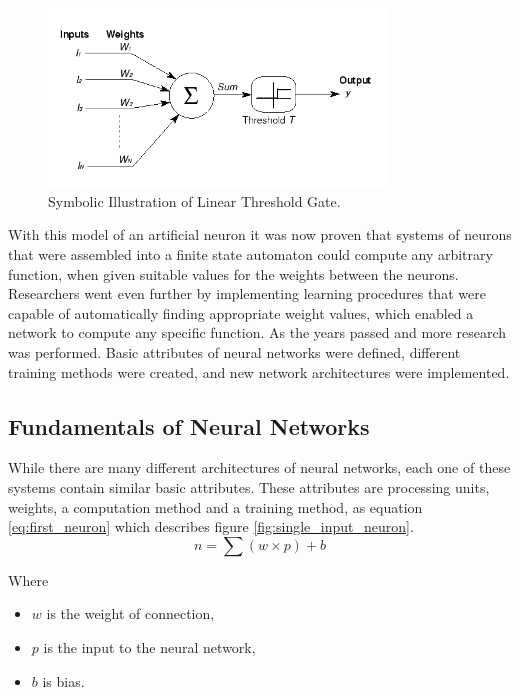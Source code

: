 \documentclass[12pt, a4paper, twoside]{report}
\begin{document}
\begin{figure}[ht]
	\centering
	\includegraphics[width=0.8\textwidth]
	{images/chapter4/artificial_neuron}
	\caption{Symbolic Illustration of Linear Threshold Gate.}
	\label{fig:artificial_neuron}
\end{figure}

With this model of an artificial neuron it was now proven that systems of neurons that were assembled into a finite state automaton could compute any arbitrary function, when given suitable values for the weights between the neurons. Researchers went even further by implementing learning procedures that were capable of automatically finding appropriate weight values, which enabled a network to compute any specific function. As the years passed and more research was performed. Basic attributes of neural networks were defined, different training methods were created, and new network architectures were implemented.

\subsection{Fundamentals of Neural Networks}
While there are many different architectures of neural networks, each one of these systems contain similar basic attributes. These attributes are processing units, weights, a computation method and a training method, as equation \ref{eq:first_neuron}  which describes figure \ref{fig:single_input_neuron}.
\begin{equation}
n = \sum (w \times p) + b
\label{eq:first_neuron}
\end{equation}

Where
\begin{itemize}[noitemsep]
\item $w$ is the weight of connection,
\item $p$ is the input to the neural network,
\item $b$ is bias.
\end{itemize}
\end{document}
